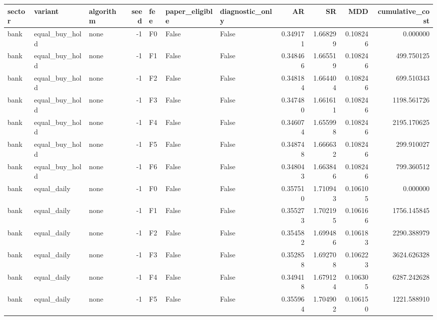 \begin{tabular}{lllrlllrrrr}
\toprule
    sector &        variant & algorithm &  seed & fee &  paper\_eligible &  diagnostic\_only &        AR &        SR &      MDD &  cumulative\_cost \\
\midrule
      bank & equal\_buy\_hold &      none &    -1 &  F0 &           False &            False &  0.349171 &  1.668299 & 0.108246 &         0.000000 \\
      bank & equal\_buy\_hold &      none &    -1 &  F1 &           False &            False &  0.348466 &  1.665519 & 0.108246 &       499.750125 \\
      bank & equal\_buy\_hold &      none &    -1 &  F2 &           False &            False &  0.348184 &  1.664404 & 0.108246 &       699.510343 \\
      bank & equal\_buy\_hold &      none &    -1 &  F3 &           False &            False &  0.347480 &  1.661611 & 0.108246 &      1198.561726 \\
      bank & equal\_buy\_hold &      none &    -1 &  F4 &           False &            False &  0.346074 &  1.655998 & 0.108246 &      2195.170625 \\
      bank & equal\_buy\_hold &      none &    -1 &  F5 &           False &            False &  0.348748 &  1.666632 & 0.108246 &       299.910027 \\
      bank & equal\_buy\_hold &      none &    -1 &  F6 &           False &            False &  0.348043 &  1.663846 & 0.108246 &       799.360512 \\
      bank &    equal\_daily &      none &    -1 &  F0 &           False &            False &  0.357510 &  1.710943 & 0.106105 &         0.000000 \\
      bank &    equal\_daily &      none &    -1 &  F1 &           False &            False &  0.355273 &  1.702195 & 0.106166 &      1756.145845 \\
      bank &    equal\_daily &      none &    -1 &  F2 &           False &            False &  0.354582 &  1.699486 & 0.106183 &      2290.388979 \\
      bank &    equal\_daily &      none &    -1 &  F3 &           False &            False &  0.352858 &  1.692708 & 0.106223 &      3624.626328 \\
      bank &    equal\_daily &      none &    -1 &  F4 &           False &            False &  0.349418 &  1.679124 & 0.106305 &      6287.242628 \\
      bank &    equal\_daily &      none &    -1 &  F5 &           False &            False &  0.355964 &  1.704902 & 0.106150 &      1221.588910 \\

\end{tabular}
